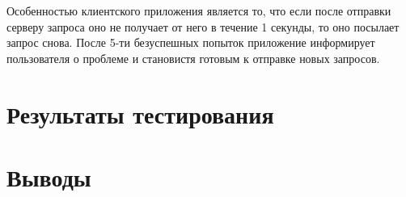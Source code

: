 Особенностью клиентского приложения является то, что если после отправки серверу запроса оно не получает от него  в течение 1 секунды, то оно посылает запрос снова. После 5-ти безуспешных попыток приложение информирует пользователя о проблеме и становистя готовым к отправке новых запросов.


\section{Результаты тестирования}

\section{Выводы}


